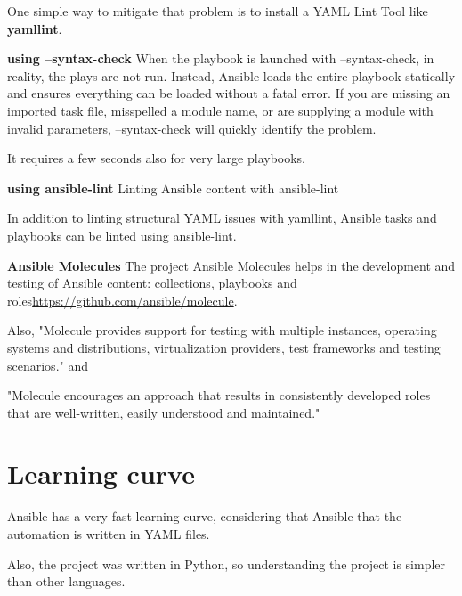 \documentclass[12pt,a4paper,openright,twoside]{book}
\begin{document}
One simple way to mitigate that problem is to install a YAML Lint Tool like \textbf{yamllint}.

\textbf{using --syntax-check}
When the playbook is launched with --syntax-check, in reality, the plays are not run. Instead, Ansible loads the entire playbook statically and ensures everything can be loaded without a fatal error. If you are missing an imported task file, misspelled a module name, or are supplying a module with invalid parameters, --syntax-check will quickly identify the problem.


It requires a few seconds also for very large playbooks.

\textbf{using ansible-lint}
Linting Ansible content with ansible-lint


In addition to linting structural YAML issues with yamllint, Ansible tasks and playbooks can be linted using ansible-lint.

\textbf{Ansible Molecules}
The project Ansible Molecules helps in the development and testing of Ansible content: collections, playbooks and roles\url{https://github.com/ansible/molecule}.


Also, "Molecule provides support for testing with multiple instances, operating systems and distributions, virtualization providers, test frameworks and testing scenarios." and 


"Molecule encourages an approach that results in consistently developed roles that are well-written, easily understood and maintained."\cite{ansibleMolecule}


\section{Learning curve}
Ansible has a very fast learning curve, considering that Ansible that the automation is written in YAML files.


Also, the project was written in Python, so understanding the project is simpler than other languages.

\end{document}

